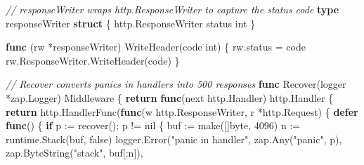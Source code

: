 \documentclass[
]{article}
\newenvironment{Shaded}{}{}
\newcommand{\BuiltInTok}[1]{\textcolor[rgb]{0.00,0.50,0.00}{#1}}
\newcommand{\CommentTok}[1]{\textcolor[rgb]{0.38,0.63,0.69}{\textit{#1}}}
\newcommand{\ControlFlowTok}[1]{\textcolor[rgb]{0.00,0.44,0.13}{\textbf{#1}}}
\newcommand{\DataTypeTok}[1]{\textcolor[rgb]{0.56,0.13,0.00}{#1}}
\newcommand{\DecValTok}[1]{\textcolor[rgb]{0.25,0.63,0.44}{#1}}
\newcommand{\KeywordTok}[1]{\textcolor[rgb]{0.00,0.44,0.13}{\textbf{#1}}}
\newcommand{\NormalTok}[1]{#1}
\newcommand{\OperatorTok}[1]{\textcolor[rgb]{0.40,0.40,0.40}{#1}}
\newcommand{\OtherTok}[1]{\textcolor[rgb]{0.00,0.44,0.13}{#1}}
\newcommand{\StringTok}[1]{\textcolor[rgb]{0.25,0.44,0.63}{#1}}
\begin{document}
\begin{Shaded}
\begin{Highlighting}[]
\CommentTok{// responseWriter wraps http.ResponseWriter to capture the status code}
\KeywordTok{type}\NormalTok{ responseWriter }\KeywordTok{struct} \OperatorTok{\{}
\NormalTok{    http}\OperatorTok{.}\NormalTok{ResponseWriter}
\NormalTok{    status }\DataTypeTok{int}
\OperatorTok{\}}

\KeywordTok{func} \OperatorTok{(}\NormalTok{rw }\OperatorTok{*}\NormalTok{responseWriter}\OperatorTok{)}\NormalTok{ WriteHeader}\OperatorTok{(}\NormalTok{code }\DataTypeTok{int}\OperatorTok{)} \OperatorTok{\{}
\NormalTok{    rw}\OperatorTok{.}\NormalTok{status }\OperatorTok{=}\NormalTok{ code}
\NormalTok{    rw}\OperatorTok{.}\NormalTok{ResponseWriter}\OperatorTok{.}\NormalTok{WriteHeader}\OperatorTok{(}\NormalTok{code}\OperatorTok{)}
\OperatorTok{\}}

\CommentTok{// Recover converts panics in handlers into 500 responses}
\KeywordTok{func}\NormalTok{ Recover}\OperatorTok{(}\NormalTok{logger }\OperatorTok{*}\NormalTok{zap}\OperatorTok{.}\NormalTok{Logger}\OperatorTok{)}\NormalTok{ Middleware }\OperatorTok{\{}
    \ControlFlowTok{return} \KeywordTok{func}\OperatorTok{(}\NormalTok{next http}\OperatorTok{.}\NormalTok{Handler}\OperatorTok{)}\NormalTok{ http}\OperatorTok{.}\NormalTok{Handler }\OperatorTok{\{}
        \ControlFlowTok{return}\NormalTok{ http}\OperatorTok{.}\NormalTok{HandlerFunc}\OperatorTok{(}\KeywordTok{func}\OperatorTok{(}\NormalTok{w http}\OperatorTok{.}\NormalTok{ResponseWriter}\OperatorTok{,}\NormalTok{ r }\OperatorTok{*}\NormalTok{http}\OperatorTok{.}\NormalTok{Request}\OperatorTok{)} \OperatorTok{\{}
            \ControlFlowTok{defer} \KeywordTok{func}\OperatorTok{()} \OperatorTok{\{}
                \ControlFlowTok{if}\NormalTok{ p }\OperatorTok{:=} \BuiltInTok{recover}\OperatorTok{();}\NormalTok{ p }\OperatorTok{!=} \OtherTok{nil} \OperatorTok{\{}
\NormalTok{                    buf }\OperatorTok{:=} \BuiltInTok{make}\OperatorTok{([]}\DataTypeTok{byte}\OperatorTok{,} \DecValTok{4096}\OperatorTok{)}
\NormalTok{                    n }\OperatorTok{:=}\NormalTok{ runtime}\OperatorTok{.}\NormalTok{Stack}\OperatorTok{(}\NormalTok{buf}\OperatorTok{,} \OtherTok{false}\OperatorTok{)}
\NormalTok{                    logger}\OperatorTok{.}\NormalTok{Error}\OperatorTok{(}\StringTok{"panic in handler"}\OperatorTok{,}
\NormalTok{                        zap}\OperatorTok{.}\NormalTok{Any}\OperatorTok{(}\StringTok{"panic"}\OperatorTok{,}\NormalTok{ p}\OperatorTok{),}
\NormalTok{                        zap}\OperatorTok{.}\NormalTok{ByteString}\OperatorTok{(}\StringTok{"stack"}\OperatorTok{,}\NormalTok{ buf}\OperatorTok{[:}\NormalTok{n}\OperatorTok{]),}

\end{Highlighting}
\end{Shaded}
\end{document}
